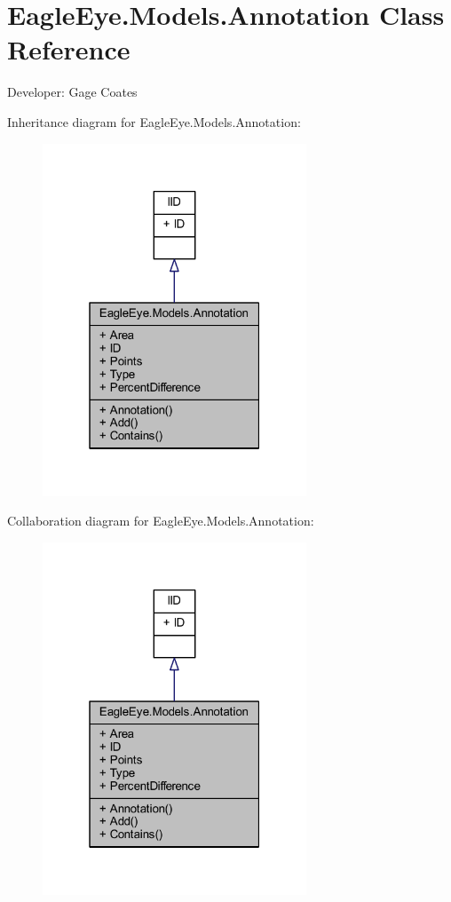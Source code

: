 \hypertarget{class_eagle_eye_1_1_models_1_1_annotation}{}\section{Eagle\+Eye.\+Models.\+Annotation Class Reference}
\label{class_eagle_eye_1_1_models_1_1_annotation}


Developer\+: Gage Coates  




Inheritance diagram for Eagle\+Eye.\+Models.\+Annotation\+:
\nopagebreak
\begin{figure}[H]
\begin{center}
\leavevmode
\includegraphics[width=223pt]{class_eagle_eye_1_1_models_1_1_annotation__inherit__graph}
\end{center}
\end{figure}


Collaboration diagram for Eagle\+Eye.\+Models.\+Annotation\+:
\nopagebreak
\begin{figure}[H]
\begin{center}
\leavevmode
\includegraphics[width=223pt]{class_eagle_eye_1_1_models_1_1_annotation__coll__graph}
\end{center}
\end{figure}
